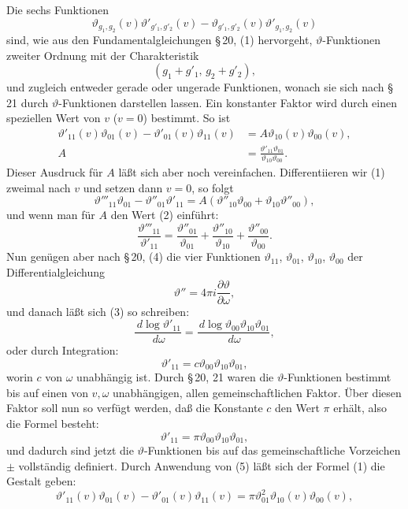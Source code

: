 \documentclass[11pt]{article}
\providecommand{\dd}{\,d}
\providecommand{\tht}{\vartheta}
\begin{document}
Die sechs Funktionen
\[
\tht_{g_1,g_2}(v)\tht'_{g'_1,g'_2}(v)-\tht_{g'_1,g'_2}(v)\tht'_{g_1,g_2}(v)
\]
sind, wie aus den Fundamentalgleichungen \S\,20, (1) hervorgeht, $\vartheta$-Funktionen zweiter Ordnung mit der Charakteristik
\[
(g_1+g'_1,\,g_2+g'_2),
\]
und zugleich entweder gerade oder ungerade Funktionen, wonach sie sich nach \S\,21 durch $\vartheta$-Funktionen darstellen lassen. Ein konstanter Faktor wird durch einen speziellen Wert von $v$ ($v=0$) bestimmt. So ist
\begin{align}
\tht'_{11}(v)\tht_{01}(v)-\tht'_{01}(v)\tht_{11}(v)&=A\tht_{10}(v)\tht_{00}(v), \tag{1}\\
A&=\frac{\tht'_{11}\tht_{01}}{\tht_{10}\tht_{00}}. \tag{2}
\end{align}
Dieser Ausdruck für $A$ läßt sich aber noch vereinfachen. Differentiieren wir (1) zweimal nach $v$ und setzen dann $v=0$, so folgt
\[
\tht'''_{11}\tht_{01}-\tht''_{01}\tht'_{11}=A(\tht''_{10}\tht_{00}+\tht_{10}\tht''_{00}),
\]
und wenn man für $A$ den Wert (2) einführt:
\begin{equation}
\frac{\tht'''_{11}}{\tht'_{11}}=\frac{\tht''_{01}}{\tht_{01}}+
\frac{\tht''_{10}}{\tht_{10}}+\frac{\tht''_{00}}{\tht_{00}}.
\tag{3}
\end{equation}
Nun genügen aber nach \S\,20, (4) die vier Funktionen $\tht_{11}$, $\tht_{01}$, $\tht_{10}$, $\tht_{00}$ der Differentialgleichung
\begin{equation}
\tht''=4\pi i\frac{\partial \tht}{\partial \omega},
\tag{4}
\end{equation}
und danach läßt sich (3) so schreiben:
\[
\frac{\dd\log\tht'_{11}}{\dd\omega}=\frac{\dd\log\tht_{00}\tht_{10}\tht_{01}}{\dd\omega},
\]
oder durch Integration:
\[
\tht'_{11}=c\tht_{00}\tht_{10}\tht_{01},
\]
worin $c$ von $\omega$ unabhängig ist. Durch \S\,20, 21 waren die $\vartheta$-Funktionen bestimmt bis auf einen von $v,\omega$ unabhängigen, allen gemeinschaftlichen Faktor. Über diesen Faktor soll nun so verfügt werden, daß die Konstante $c$ den Wert $\pi$ erhält, also die Formel besteht:
\begin{equation}
\tht'_{11}=\pi\tht_{00}\tht_{10}\tht_{01},
\tag{5}
\end{equation}
und dadurch sind jetzt die $\vartheta$-Funktionen bis auf das gemeinschaftliche Vorzeichen $\pm$ vollständig definiert. Durch Anwendung von (5) läßt sich der Formel (1) die Gestalt geben:
\begin{equation}
\tht'_{11}(v)\tht_{01}(v)-\tht'_{01}(v)\tht_{11}(v)=\pi\tht_{01}^{2}\tht_{10}(v)\tht_{00}(v),
\tag{6}
\end{equation}
\end{document}
